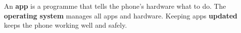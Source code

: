 \sectionrule

\begin{bigidea}
  An \textbf{app} is a programme that tells the phone's hardware what to do.
  The \textbf{operating system} manages all apps and hardware.
  Keeping apps \textbf{updated} keeps the phone working well and safely.
\end{bigidea}

